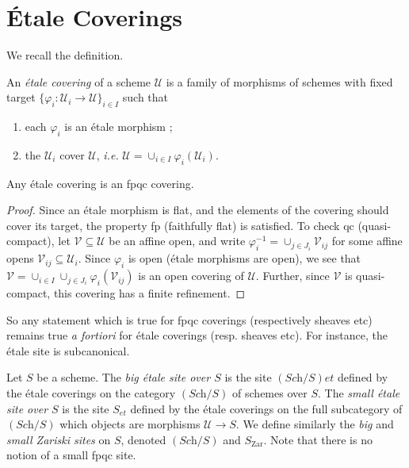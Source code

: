 \section{\'Etale Coverings}
\label{section-etale-covering}

\noindent
We recall the definition.

\begin{definition}
\label{definition-etale-covering}
An {\it \'etale covering} of a scheme $\mathcal{U}$ is a family of morphisms 
of schemes with fixed target $\{ \varphi_i : \mathcal{U}_i \to \mathcal{U} 
\}_{i \in I}$ such that 
\begin{enumerate}
\item each $\varphi_i$ is an \'etale morphism ;
\item the $\mathcal{U}_i$ cover $\mathcal{U}$, {\it i.e.} $\mathcal{U} = 
\cup_{i\in I}\varphi_i(\mathcal{U}_i)$.
\end{enumerate}
\end{definition}

\begin{lemma}
\label{lemma-etale-fpqc}
Any \'etale covering is an fpqc covering. 
\end{lemma}

\begin{proof}
Since an \'etale morphism is flat, and the elements of the covering should 
cover its target, the property fp (faithfully flat) is satisfied. To check qc 
(quasi-compact), let $\mathcal{V} \subseteq \mathcal{U}$ be an affine open, and 
write $\varphi_i^{-1} = \cup_{j \in J_i} \mathcal{V}_{ij}$ for some affine 
opens $\mathcal{V}_{ij} \subseteq \mathcal{U}_i$. Since $\varphi_i$ is open 
(\'etale morphisms are open), we see that $\mathcal{V} = \cup_{i\in I}\cup_{j 
\in J_i} \varphi_i(\mathcal{V}_{ij})$ is an open covering of $\mathcal{U}$. 
Further, since $\mathcal{V}$ is quasi-compact, this covering has a finite 
refinement.
\end{proof}

\noindent
So any statement which is true for fpqc coverings (respectively sheaves etc) 
remains true {\it a fortiori} for \'etale coverings (resp. sheaves etc). For 
instance, the \'etale site is subcanonical.

\begin{definition}
\label{definition-big-etale-site}
Let $S$ be a scheme. The {\it big \'etale site over $S$} is the site 
$(\textit{Sch}/S)et$ defined by the \'etale coverings on the category 
$(\textit{Sch}/S)$ of schemes over $S$. The
{\it small \'etale site over $S$} is
the site $S_{et}$ defined by the \'etale coverings on the full subcategory of 
$(\textit{Sch}/S)$ which objects are morphisms $\mathcal{U} \to S$. We define 
similarly the {\it big} and {\it small Zariski sites} on $S$, denoted
$(\textit{Sch}/S)$ and $S_\mathrm{Zar}$. Note that there is no notion
of a small fpqc site.
\end{definition}

